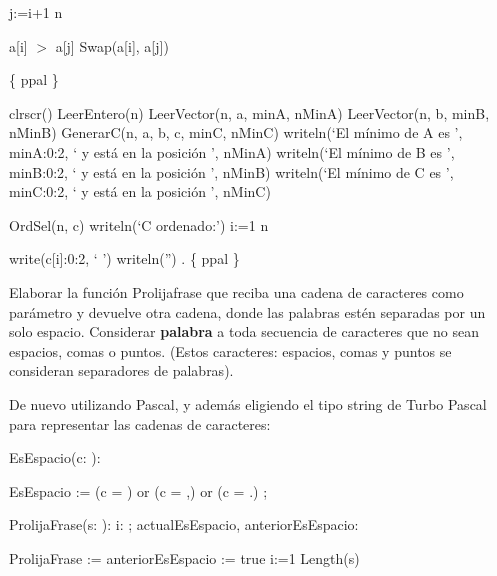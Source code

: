 \documentclass[answers]{exam}
\begin{document}
\begin{questions}
\begin{solution}
\begin{algorithm}[H]
\qquad	\qquad	\For j:=i+1 \To n \Do\

\qquad	\qquad \qquad	\If a[i] $>$ a[j] \Then Swap(a[i], a[j])\;
\End\;

\BlankLine

\Begin \{ ppal \}\

\qquad	clrscr()\;
\qquad	LeerEntero(n)\;
\qquad	LeerVector(n, a, minA, nMinA)\;
\qquad	LeerVector(n, b, minB, nMinB)\;
\qquad	GenerarC(n, a, b, c, minC, nMinC)\;
\qquad	writeln(`El mínimo de A es ', minA:0:2, ` y está en la posición ', nMinA)\;
\qquad	writeln(`El mínimo de B es ', minB:0:2, ` y está en la posición ', nMinB)\;
\qquad	writeln(`El mínimo de C es ', minC:0:2, ` y está en la posición ', nMinC)\;

\BlankLine

\qquad	OrdSel(n, c)\;
\qquad	writeln(`C ordenado:')\;
\qquad	\For 	i:=1 \To n \Do\

\qquad	\qquad	write(c[i]:0:2, ` ')\;
\qquad	writeln('')\;
\End. \{ ppal \}

\end{algorithm}

\end{solution}

\question Elaborar la función Prolijafrase que reciba una cadena de caracteres como parámetro y devuelve otra cadena, donde las palabras estén separadas por un solo espacio. Considerar \textbf{palabra} a toda secuencia de caracteres que no sean espacios, comas o puntos. (Estos caracteres: espacios, comas y puntos se consideran separadores de palabras).


\begin{solution}
De nuevo utilizando Pascal, y además eligiendo el tipo string de Turbo Pascal para representar las cadenas de caracteres:

\begin{algorithm}[H]
\Function EsEspacio(c: \Char): \Boolean\;
\Begin\

\qquad	EsEspacio := (c = \textsc{} \textsc{}) or (c = \textsc{},\textsc{}) or (c = \textsc{}.\textsc{})\;
\End;

\BlankLine

\Function ProlijaFrase(s: \String): \String\;
\Var i: \Integer ; actualEsEspacio, anteriorEsEspacio: \Boolean\;
\Begin\

\qquad	ProlijaFrase := \textsc{}\textsc{}\;
\qquad	anteriorEsEspacio := true\;
\qquad	\For i:=1 \To Length(s) \Do\


\end{algorithm}
\end{solution}
\end{questions}
\end{document}
